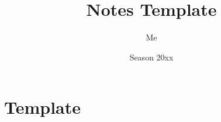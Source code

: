 \documentclass[a4paper,10pt]{article}
\title{Notes Template}
\date{Season 20xx}
\author{Me}
\theoremstyle{sltheorem}
\begin{document}
\maketitle

\section{Template}
\end{document}
